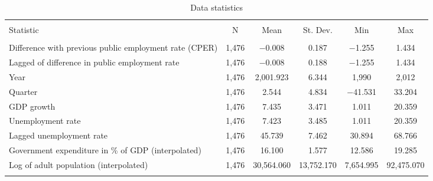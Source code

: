 
\begin{table}[!htbp] \centering 
  \caption{Data statistics} 
  \label{} 
\footnotesize 
\begin{tabular}{@{\extracolsep{5pt}}lccccc} 
\\[-1.8ex]\hline 
\hline \\[-1.8ex] 
Statistic & \multicolumn{1}{c}{N} & \multicolumn{1}{c}{Mean} & \multicolumn{1}{c}{St. Dev.} & \multicolumn{1}{c}{Min} & \multicolumn{1}{c}{Max} \\ 
\hline \\[-1.8ex] 
Difference with previous public employment rate (CPER) & 1,476 & $-$0.008 & 0.187 & $-$1.255 & 1.434 \\ 
Lagged of difference in public employment rate & 1,476 & $-$0.008 & 0.188 & $-$1.255 & 1.434 \\ 
Year & 1,476 & 2,001.923 & 6.344 & 1,990 & 2,012 \\ 
Quarter & 1,476 & 2.544 & 4.834 & $-$41.531 & 33.204 \\ 
GDP growth & 1,476 & 7.435 & 3.471 & 1.011 & 20.359 \\ 
Unemployment rate & 1,476 & 7.423 & 3.485 & 1.011 & 20.359 \\ 
Lagged unemployment rate & 1,476 & 45.739 & 7.462 & 30.894 & 68.766 \\ 
Government expenditure in \% of GDP (interpolated) & 1,476 & 16.100 & 1.577 & 12.586 & 19.285 \\ 
Log of adult population (interpolated) & 1,476 & 30,564.060 & 13,752.170 & 7,654.995 & 92,475.070 \\ 
\hline \\[-1.8ex] 
\end{tabular} 
\end{table} 
